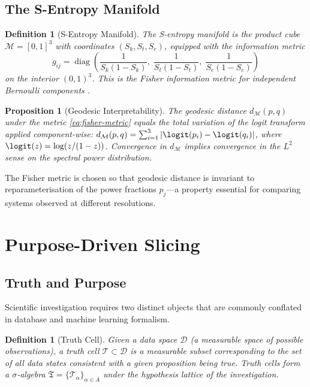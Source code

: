 \documentclass[10pt,twocolumn]{article}
\newtheorem{proposition}[theorem]{Proposition}
\newtheorem{definition}[theorem]{Definition}
\DeclareMathOperator{\diag}{diag}
\newcommand{\TruthCell}{\mathcal{T}}
\newcommand{\DataSpace}{\mathcal{D}}
\newcommand{\ManifoldM}{\mathcal{M}}
\begin{document}
\subsection{The S-Entropy Manifold}

\begin{definition}[S-Entropy Manifold]
The \emph{S-entropy manifold} is the product cube
$\ManifoldM = [0,1]^3$ with coordinates $(S_k, S_t, S_e)$,
equipped with the information metric
\begin{equation}
g_{ij} = \diag\!\left(\frac{1}{S_k(1-S_k)},\; \frac{1}{S_t(1-S_t)},\; \frac{1}{S_e(1-S_e)}\right)
\label{eq:fisher-metric}
\end{equation}
on the interior $(0,1)^3$. This is the Fisher information metric for
independent Bernoulli components \cite{amari1998}.
\end{definition}

\begin{proposition}[Geodesic Interpretability]
\label{prop:geodesic}
The geodesic distance $d_{\mathcal{M}}(p, q)$ under the metric \eqref{eq:fisher-metric}
equals the total variation of the logit transform applied component-wise:
$d_{\mathcal{M}}(p, q) = \sum_{i=1}^3 |\logit(p_i) - \logit(q_i)|$,
where $\logit(z) = \log(z/(1-z))$.
Convergence in $d_{\mathcal{M}}$ implies convergence in the
$L^2$ sense on the spectral power distribution.
\end{proposition}

The Fisher metric is chosen so that geodesic distance is invariant to
reparameterisation of the power fractions $p_j$---a property essential
for comparing systems observed at different resolutions.

\section{Purpose-Driven Slicing}
\label{sec:probing}

\subsection{Truth and Purpose}

Scientific investigation requires two distinct objects that are
commonly conflated in database and machine learning formalism.

\begin{definition}[Truth Cell]
\label{def:truth-cell}
Given a data space $\DataSpace$ (a measurable space of possible observations),
a \emph{truth cell} $\TruthCell \subset \DataSpace$ is a measurable subset
corresponding to the set of all data states consistent with a given
proposition being true. Truth cells form a $\sigma$-algebra
$\mathfrak{T} = \{\TruthCell_\alpha\}_{\alpha \in A}$ under the
hypothesis lattice of the investigation.
\end{definition}
\end{document}
